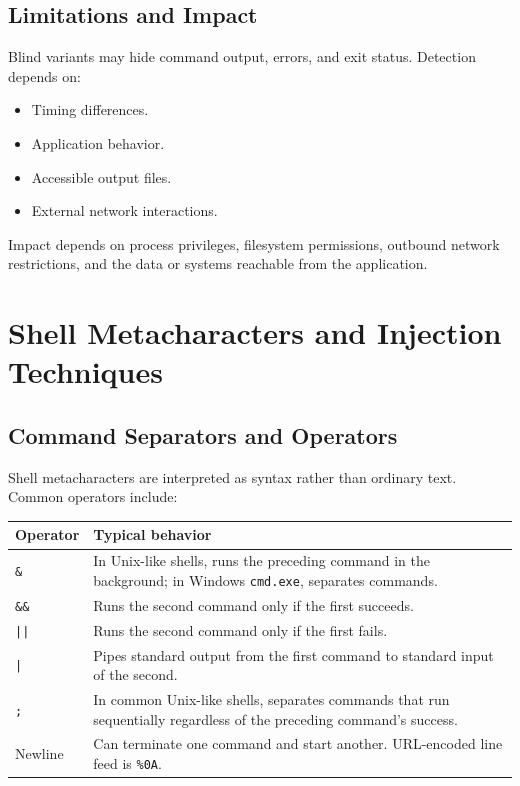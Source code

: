 \documentclass[12pt,a4paper]{article}
\newcommand{\nsection}[1]{\section{#1}}
\newcommand{\nsubsection}[1]{\subsection{#1}}
\begin{document}
\vspace{0.5cm}
\nsubsection{Limitations and Impact}

Blind variants may hide command output, errors, and exit status.
Detection depends on:

\begin{itemize}
    \item Timing differences.
    \item Application behavior.
    \item Accessible output files.
    \item External network interactions.
\end{itemize}

Impact depends on process privileges, filesystem permissions,
outbound network restrictions, and the data or systems reachable
from the application.

\newpage
\nsection{Shell Metacharacters and Injection Techniques}

\vspace{0.5cm}
\nsubsection{Command Separators and Operators}

Shell metacharacters are interpreted as syntax rather than
ordinary text. Common operators include:

\begin{longtable}{>{\centering\arraybackslash}p{}
        >{\raggedright\arraybackslash}p{}}
    \toprule
    \textbf{Operator} & \textbf{Typical behavior}       \\
    \midrule
    \texttt{\&}       &
    In Unix-like shells, runs the preceding command in the background;
    in Windows \texttt{cmd.exe}, separates commands.    \\
    \texttt{\&\&}     &
    Runs the second command only if the first succeeds. \\
    \texttt{||}       &
    Runs the second command only if the first fails.    \\
    \texttt{|}        &
    Pipes standard output from the first command to standard input
    of the second.                                      \\
    \texttt{;}        &
    In common Unix-like shells, separates commands that run sequentially
    regardless of the preceding command's success.      \\
    Newline           &
    Can terminate one command and start another. URL-encoded line
    feed is \texttt{\%0A}.                              \\
    \bottomrule
\end{longtable}
\end{document}
